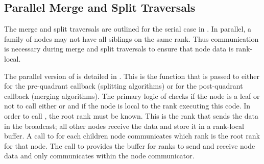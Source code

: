 
\subsection{Parallel Merge and Split Traversals}

The merge and split traversals are outlined for the serial case in . In parallel, a family of nodes may not have all siblings on the same rank. Thus communication is necessary during merge and split traversals to ensure that node data is rank-local.

The parallel version of  is detailed in . This is the function that is passed to  either for the pre-quadrant callback (splitting algorithms) or for the post-quadrant callback (merging algorithms). The primary logic of  checks if the node is a leaf or not to call either  or  and if the node is local to the rank executing this code. In order to call , the root rank must be known. This is the rank that sends the data in the broadcast; all other nodes receive the data and store it in a rank-local buffer. A call to  for each children node communicates which rank is the root rank for that node. The call to  provides the buffer for ranks to send and receive node data and only communicates within the node communicator.

